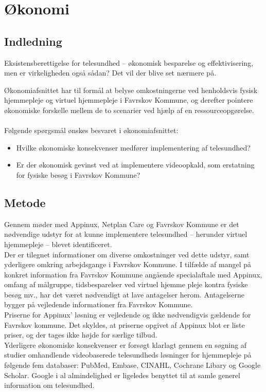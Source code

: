 \chapter{Økonomi}
\section{Indledning}
Eksistensberettigelse for telesundhed – økonomisk besparelse og effektivisering, men er virkeligheden også sådan? Det vil der blive set nærmere på.

Økonomiafsnittet har til formål at belyse omkostningerne ved henholdsvis fysisk hjemmepleje og virtuel hjemmepleje i Favrskov Kommune, og derefter pointere økonomiske forskelle mellem de to scenarier ved hjælp af en ressourceopgørelse.\\ \\
Følgende spørgsmål ønskes besvaret i økonomiafsnittet:
\begin{itemize}
	\item Hvilke økonomiske konsekvenser medfører implementering af telesundhed?
	\item Er der økonomisk gevinst ved at implementere videoopkald, som erstatning for fysiske besøg i Favrskov Kommune?
\end{itemize}

\section{Metode}
Gennem møder med Appinux, Netplan Care og Favrskov Kommune er det nødvendige udstyr for at kunne implementere telesundhed – herunder virtuel hjemmepleje – blevet identificeret.\\
Der er tilegnet informationer om diverse omkostninger ved dette udstyr, samt yderligere omkring arbejdsgange i Favrskov Kommune. 
I tilfælde af mangel på konkret information fra Favrskov Kommune angående specialaftale med Appinux, omfang af målgruppe, tidsbesparelser ved virtuel hjemme pleje kontra fysiske besøg mv., har det været nødvendigt at lave antagelser herom. Antagelserne bygger på vejledende informationer fra Favrskov Kommune.\\
Priserne for Appinux’ løsning er vejledende og ikke nødvendigvis gældende for Favrskov kommune. Det skyldes, at priserne opgivet af Appinux blot er liste priser, og der tages ikke højde for særlige tilbud.\\
Yderligere økonomiske konsekvenser er forsøgt klarlagt gennem en søgning af studier omhandlende videobaserede telesundheds løsninger for hjemmepleje på følgende fem databaser: PubMed, Embase, CINAHL, Cochrane Libary og Google Scholar. Google i al almindelighed er ligeledes benyttet til at samle generel information om telesundhed. 


